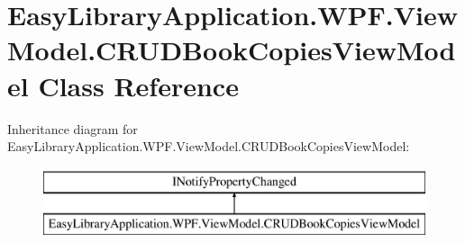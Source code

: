 \hypertarget{class_easy_library_application_1_1_w_p_f_1_1_view_model_1_1_c_r_u_d_book_copies_view_model}{}\section{Easy\+Library\+Application.\+W\+P\+F.\+View\+Model.\+C\+R\+U\+D\+Book\+Copies\+View\+Model Class Reference}
\label{class_easy_library_application_1_1_w_p_f_1_1_view_model_1_1_c_r_u_d_book_copies_view_model}
Inheritance diagram for Easy\+Library\+Application.\+W\+P\+F.\+View\+Model.\+C\+R\+U\+D\+Book\+Copies\+View\+Model\+:\begin{figure}[H]
\begin{center}
\leavevmode
\includegraphics[height=2.000000cm]{class_easy_library_application_1_1_w_p_f_1_1_view_model_1_1_c_r_u_d_book_copies_view_model}
\end{center}
\end{figure}
